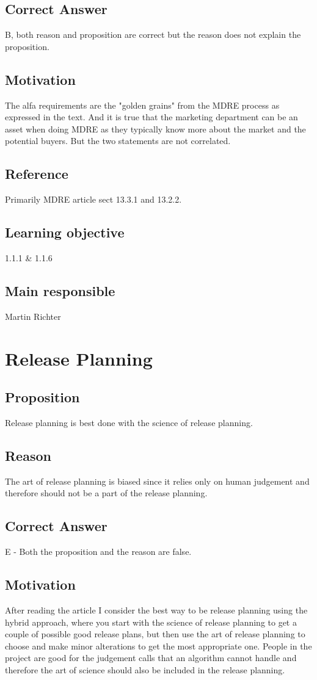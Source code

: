 \documentclass[a4paper]{article}
\begin{document}
\subsection*{Correct Answer}
B, both reason and proposition are correct but the reason does not explain the proposition.
\subsection*{Motivation}
The alfa requirements are the "golden grains" from the MDRE process as expressed in the text. And it is true that the marketing department can be an asset when doing MDRE as they typically know more about the market and the potential buyers. But the two statements are not correlated.
\subsection*{Reference}
Primarily MDRE article sect 13.3.1 and 13.2.2.
\subsection*{Learning objective}
1.1.1 \& 1.1.6
\subsection*{Main responsible}
Martin Richter

\section{Release Planning}
\subsection*{Proposition}
Release planning is best done with the science of release planning.
\subsection*{Reason}
The art of release planning is biased since it relies only on human judgement and therefore should not be a part of the release planning.
\subsection*{Correct Answer}
E - Both the proposition and the reason are false.
\subsection*{Motivation}
After reading the article I consider the best way to be release planning using the hybrid approach, where you start with the science of release planning to get a couple of possible good release plans, but then use the art of release planning to choose and make minor alterations to get the most appropriate one. People in the project are good for the judgement calls that an algorithm cannot handle and therefore the art of science should also be included in the release planning. 
\end{document}
